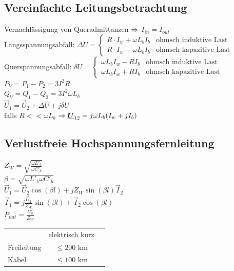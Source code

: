\documentclass[fs, footer]{latex4ei}
\begin{document}
\begin{multicols}{4}
		\subsection{Vereinfachte Leitungsbetrachtung}
		
		
		Vernachlässigung von Queradmittanzen $\Rightarrow$ $I_{in} = I_{out}$\\
		Längsspannungsabfall: $\Delta U = \begin{cases} R \cdot I_w + \omega L_b I_b & \text{ohmsch induktive Last} \\ R \cdot I_w - \omega L_b I_b  & \text{ohmsch kapazitive Last} \end{cases} $\\
		Querspannungsabfall: $\delta U = \begin{cases} \omega L_b I_w - R I_b & \text{ohmsch induktive Last} \\ \omega L_b I_w + R I_b & \text{ohmsch kapazitive Last} \end{cases}$\\
		$P_V = P_1 - P_2 = 3 I^2 R$ \\
		$Q_V = Q_1 - Q_2 = 3 I^2 \omega L_b$ \\
		$\vec U_1 = \vec U_2 + \Delta U + j \delta U$ \\
		falls $R << \omega L_b$ \quad $\Rightarrow \underline{\boldsymbol {U}}_{12} = j \omega L_b (I_w + j I_b)$
		
		\subsection{Verlustfreie Hochspannungsfernleitung}
		
		
		$Z_W = \sqrt{\frac{\omega L'_b}{\omega C'_b}}$ \\
		$\beta = \sqrt{\omega L'_b \omega C'_b}$ \\
		$\vec U_1 = \vec U_2 \cos (\beta l) + j Z_W \sin (\beta l) \vec I_2$ \\
		$\vec I_1 = j \frac{\vec U_2}{Z_W} \sin (\beta l) + \vec I_2 \cos (\beta l)$ \\
		$P_{nat} = \frac{U_n^2}{Z_W}$ \\
		
		\begin{tabular}{lcc}
		 & elektrisch kurz \\
		Freileitung & $\le 200$ km \\
		Kabel & $\le 100$ km
		\end{tabular}


\end{multicols}
\end{document}
